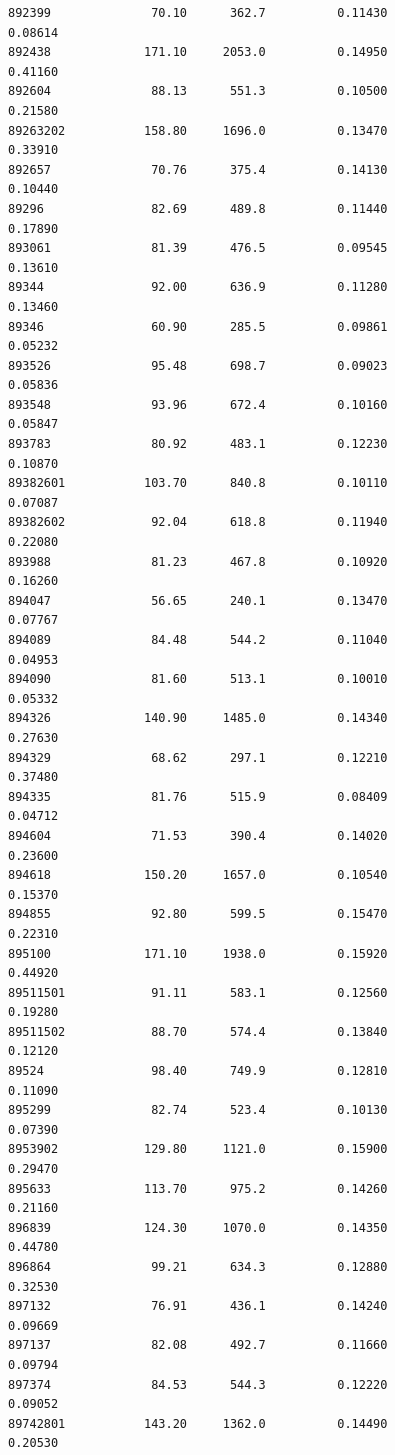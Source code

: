 \documentclass[
  letterpaper,
  DIV=11,
  numbers=noendperiod]{scrartcl}
\begin{document}
\begin{verbatim}
892399              70.10      362.7          0.11430           0.08614
892438             171.10     2053.0          0.14950           0.41160
892604              88.13      551.3          0.10500           0.21580
89263202           158.80     1696.0          0.13470           0.33910
892657              70.76      375.4          0.14130           0.10440
89296               82.69      489.8          0.11440           0.17890
893061              81.39      476.5          0.09545           0.13610
89344               92.00      636.9          0.11280           0.13460
89346               60.90      285.5          0.09861           0.05232
893526              95.48      698.7          0.09023           0.05836
893548              93.96      672.4          0.10160           0.05847
893783              80.92      483.1          0.12230           0.10870
89382601           103.70      840.8          0.10110           0.07087
89382602            92.04      618.8          0.11940           0.22080
893988              81.23      467.8          0.10920           0.16260
894047              56.65      240.1          0.13470           0.07767
894089              84.48      544.2          0.11040           0.04953
894090              81.60      513.1          0.10010           0.05332
894326             140.90     1485.0          0.14340           0.27630
894329              68.62      297.1          0.12210           0.37480
894335              81.76      515.9          0.08409           0.04712
894604              71.53      390.4          0.14020           0.23600
894618             150.20     1657.0          0.10540           0.15370
894855              92.80      599.5          0.15470           0.22310
895100             171.10     1938.0          0.15920           0.44920
89511501            91.11      583.1          0.12560           0.19280
89511502            88.70      574.4          0.13840           0.12120
89524               98.40      749.9          0.12810           0.11090
895299              82.74      523.4          0.10130           0.07390
8953902            129.80     1121.0          0.15900           0.29470
895633             113.70      975.2          0.14260           0.21160
896839             124.30     1070.0          0.14350           0.44780
896864              99.21      634.3          0.12880           0.32530
897132              76.91      436.1          0.14240           0.09669
897137              82.08      492.7          0.11660           0.09794
897374              84.53      544.3          0.12220           0.09052
89742801           143.20     1362.0          0.14490           0.20530

\end{verbatim}
\end{document}
